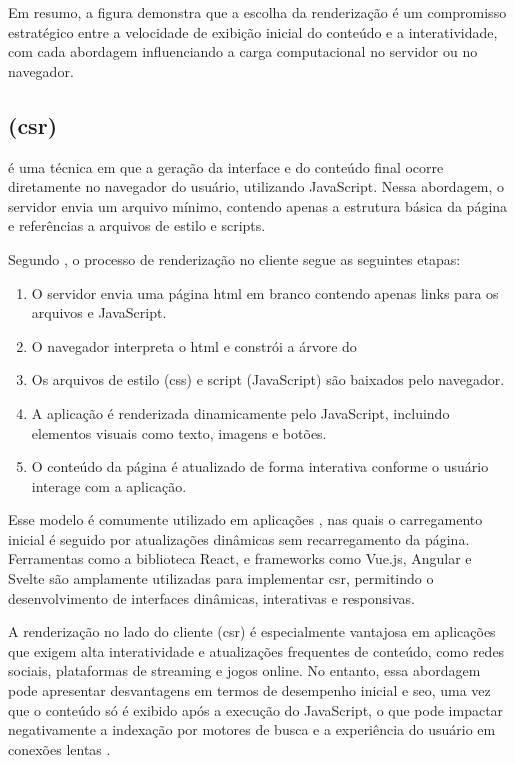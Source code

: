 Em resumo, a figura demonstra que a escolha da renderização é um compromisso estratégico entre a velocidade de exibição inicial do conteúdo e a interatividade, com cada abordagem influenciando a carga computacional no servidor ou no navegador.

\subsection{ (\acrshort{csr})}
\label{subsec:csr}

  é uma técnica em que a geração da interface e do conteúdo final ocorre diretamente no navegador do usuário, utilizando JavaScript. Nessa abordagem, o servidor envia um arquivo  mínimo, contendo apenas a estrutura básica da página e referências a arquivos de estilo e scripts.{\cite{atori2024}}

Segundo , o processo de renderização no cliente segue as seguintes etapas:

\begin{enumerate}
    \item O servidor envia uma página \acrshort{html} em branco contendo apenas links para os arquivos  e JavaScript.
    \item O navegador interpreta o \acrshort{html} e constrói a árvore do 
    \item Os arquivos de estilo (\acrshort{css}) e script (JavaScript) são baixados pelo navegador.
    \item A aplicação é renderizada dinamicamente pelo JavaScript, incluindo elementos visuais como texto, imagens e botões.
    \item O conteúdo da página é atualizado de forma interativa conforme o usuário interage com a aplicação.
\end{enumerate}

Esse modelo é comumente utilizado em aplicações , nas quais o carregamento inicial é seguido por atualizações dinâmicas sem recarregamento da página. Ferramentas como a biblioteca React, e frameworks como Vue.js, Angular e Svelte são amplamente utilizadas para implementar \acrshort{csr}, permitindo o desenvolvimento de interfaces dinâmicas, interativas e responsivas.


A renderização no lado do cliente (\acrshort{csr}) é especialmente vantajosa em aplicações que exigem alta interatividade e atualizações frequentes de conteúdo, como redes sociais, plataformas de streaming e jogos online. No entanto, essa abordagem pode apresentar desvantagens em termos de desempenho inicial e \acrshort{seo}, uma vez que o conteúdo só é exibido após a execução do JavaScript, o que pode impactar negativamente a indexação por motores de busca e a experiência do usuário em conexões lentas \cite{atori2024}.

